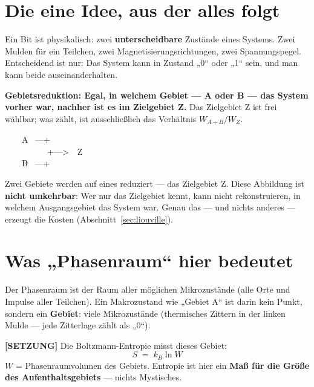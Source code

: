 \section{Die eine Idee, aus der alles folgt}

Ein Bit ist physikalisch: zwei \textbf{unterscheidbare} Zustände eines Systems.
Zwei Mulden für ein Teilchen, zwei Magnetisierungsrichtungen, zwei Spannungspegel.
Entscheidend ist nur: Das System kann in Zustand „0“ oder „1“ sein, und man kann
beide auseinanderhalten.

\textbf{Gebietsreduktion: Egal, in welchem Gebiet --- A oder B --- das System
vorher war, nachher ist es im Zielgebiet Z.} Das Zielgebiet Z ist frei wählbar;
was zählt, ist ausschließlich das Verhältnis $W_{A+B}/W_Z$.

\begin{center}
\begin{minipage}{0.42\textwidth}
\ttfamily\small
\begin{tabbing}
\ \ \ \ A \ ---+\\
\ \ \ \ \ \ \ \ \ \ +--->\ \ Z\\
\ \ \ \ B \ ---+
\end{tabbing}
\end{minipage}
\end{center}

Zwei Gebiete werden auf eines reduziert --- das Zielgebiet Z. Diese Abbildung ist
\textbf{nicht umkehrbar}: Wer nur das Zielgebiet kennt, kann nicht rekonstruieren,
in welchem Ausgangsgebiet das System war. Genau das --- und nichts anderes ---
erzeugt die Kosten (Abschnitt~\ref{sec:liouville}).

\section{Was „Phasenraum“ hier bedeutet}

Der Phasenraum ist der Raum aller möglichen Mikrozustände (alle Orte und Impulse
aller Teilchen). Ein Makrozustand wie „Gebiet A“ ist darin kein Punkt, sondern ein
\textbf{Gebiet}: viele Mikrozustände (thermisches Zittern in der linken Mulde ---
jede Zitterlage zählt als „0“).

\textbf{[SETZUNG]} Die Boltzmann-Entropie misst dieses Gebiet:
\[
  S \;=\; k_B \ln W
\]
$W$ = Phasenraumvolumen des Gebiets. Entropie ist hier ein \textbf{Maß für die
Größe des Aufenthaltsgebiets} --- nichts Mystisches.

